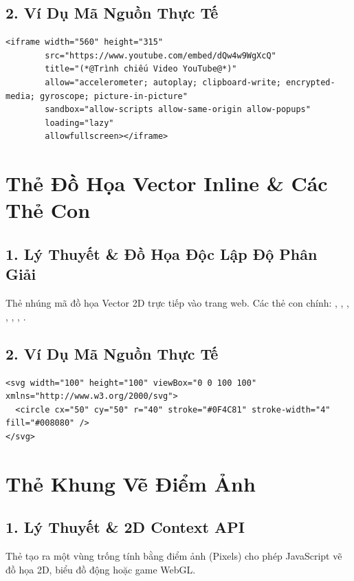 \subsection{2. Ví Dụ Mã Nguồn Thực Tế}
\begin{lstlisting}[language=HTML5, caption={Ví dụ nhúng video YouTube an toàn với sandbox và allow}]
<iframe width="560" height="315"
        src="https://www.youtube.com/embed/dQw4w9WgXcQ"
        title="(*@Trình chiếu Video YouTube@*)"
        allow="accelerometer; autoplay; clipboard-write; encrypted-media; gyroscope; picture-in-picture"
        sandbox="allow-scripts allow-same-origin allow-popups"
        loading="lazy"
        allowfullscreen></iframe>
\end{lstlisting}

\section{Thẻ Đồ Họa Vector Inline  \& Các Thẻ Con}
\subsection{1. Lý Thuyết \& Đồ Họa Độc Lập Độ Phân Giải}
Thẻ  nhúng mã đồ họa Vector 2D trực tiếp vào trang web. Các thẻ con chính: , , , , , , .

\subsection{2. Ví Dụ Mã Nguồn Thực Tế}
\begin{lstlisting}[language=HTML5, caption={Ví dụ vẽ icon hình tròn và hình sao bằng SVG}]
<svg width="100" height="100" viewBox="0 0 100 100" xmlns="http://www.w3.org/2000/svg">
  <circle cx="50" cy="50" r="40" stroke="#0F4C81" stroke-width="4" fill="#008080" />
</svg>
\end{lstlisting}

\section{Thẻ Khung Vẽ Điểm Ảnh }
\subsection{1. Lý Thuyết \& 2D Context API}
Thẻ  tạo ra một vùng trống tính bằng điểm ảnh (Pixels) cho phép JavaScript vẽ đồ họa 2D, biểu đồ động hoặc game WebGL.

